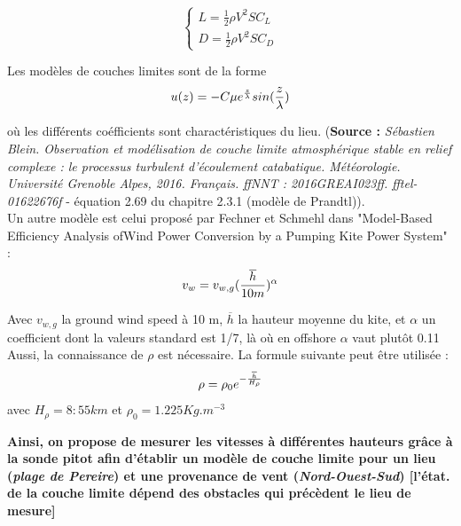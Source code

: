 \begin{equation}
    \begin{cases}
        L = \frac{1}{2} \rho V^2 SC_L \\
        D = \frac{1}{2} \rho V^2 SC_D 
    \end{cases}
    \label{eq:clcd}
\end{equation}

Les modèles de couches limites sont de la forme 
\begin{equation}
        u(z) = -C \mu e^{\frac{z}{\lambda}} sin(\frac{z}{\lambda}) \\
\end{equation}

où les différents coéfficients sont charactéristiques du lieu. (\textbf{Source :} \textit{Sébastien Blein. Observation et modélisation de couche limite atmosphérique stable en relief complexe : le processus turbulent d’écoulement catabatique. Météorologie. Université Grenoble Alpes, 2016. Français. ffNNT : 2016GREAI023ff. fftel-01622676f} - équation 2.69 du chapitre 2.3.1 (modèle de Prandtl)). \\

Un autre modèle est celui proposé par Fechner et Schmehl dans "Model-Based Efficiency Analysis ofWind Power Conversion by a Pumping Kite Power System" :  
\begin{equation}
    v_w = v_{w,g} (\frac{\overline{h}}{ 10 m })^{\alpha} \\
\end{equation}

Avec $v_{w,g}$ la ground wind speed à 10 m, $\overline{h}$ la hauteur moyenne du kite, et $\alpha$ un coefficient dont la valeurs standard est 1/7, là où en offshore $\alpha$ vaut plutôt 0.11\\

Aussi, la connaissance de $\rho$ est nécessaire. La formule suivante peut être utilisée :
\begin{equation}
    \rho = \rho_{0} e^{-\frac{\overline{h}}{H_{\rho}}} \\
\end{equation}
avec $H_{\rho} = 8:55 km$ et $\rho_{0} = 1.225 Kg.m^{-3}$

\textbf{Ainsi, on propose de mesurer les vitesses à différentes hauteurs grâce à la sonde pitot afin d'établir un modèle de couche limite pour un lieu (\textit{plage de Pereire}) et une provenance de vent (\textit{Nord-Ouest-Sud}) [l'état. de la couche limite dépend des obstacles qui précèdent le lieu de mesure]}

